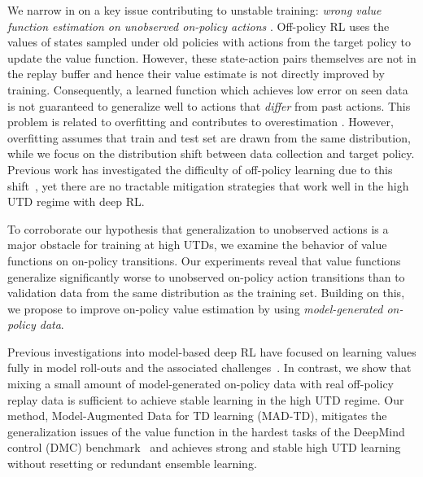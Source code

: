 We narrow in on a key issue contributing to unstable training: \emph{wrong value function estimation on unobserved on-policy actions} \parencite{thrun1993issues,tsitsiklis1996analysis}.
Off-policy RL uses the values of states sampled under old policies with actions from the target policy to update the value function.
However, these state-action pairs themselves are not in the replay buffer and hence their value estimate is not directly improved by training.
Consequently, a learned function which achieves low error on seen data is not guaranteed to generalize well to actions that \emph{differ} from past actions.
This problem is related to overfitting \parencite{li2023efficient} and contributes to overestimation \parencite{thrun1993issues,hasselt2010double,fujimoto2018addressing}.
However, overfitting assumes that train and test set are drawn from the same distribution, while we focus on the distribution shift between data collection and target policy.
Previous work has investigated the difficulty of off-policy learning due to this shift~\parencite{maei2009convergent,sutton2016emphatic,hasselt2010double,fujimoto2018addressing}, yet there are no tractable mitigation strategies that work well in the high UTD regime with deep RL.

To corroborate our hypothesis that generalization to unobserved actions is a major obstacle for training at high UTDs, we examine the behavior of value functions on on-policy transitions. 
Our experiments reveal that value functions generalize significantly worse to unobserved on-policy action transitions than to validation data from the same distribution as the training set.
Building on this, we propose to improve on-policy value estimation by using \emph{model-generated on-policy data}.

Previous investigations into model-based deep RL have focused on learning values fully in model roll-outs \parencite{buckman2018sample,janner2019mbpo,hafner2020dream,ghugare2023simplifying} and the associated challenges~\parencite{zhao2023simplified,hansen2024tdmpc}.
In contrast, we show that mixing a small amount of model-generated on-policy data with real off-policy replay data is sufficient to achieve stable learning in the high UTD regime.
Our method, Model-Augmented Data for TD learning (MAD-TD), mitigates the generalization issues of the value function in the hardest tasks of the DeepMind control (DMC) benchmark~\parencite{tunyasuvunakool2020dmcontrol} and achieves strong and stable high UTD learning without resetting or redundant ensemble learning. 

